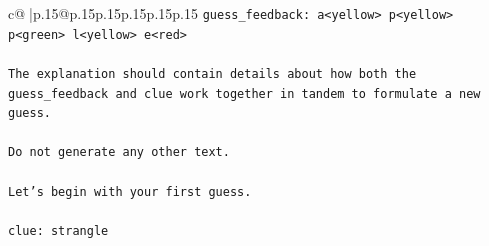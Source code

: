 \documentclass{article}
\begin{document}
{\begin{supertabular}{c@{$\;$}|p{.15\linewidth}@{}p{.15\linewidth}p{.15\linewidth}p{.15\linewidth}p{.15\linewidth}p{.15\linewidth}}
{{{\texttt{guess\_feedback: a<yellow> p<yellow> p<green> l<yellow> e<red>} \\
\\ 
\texttt{The explanation should contain details about how both the guess\_feedback and clue work together in tandem to formulate a new guess.} \\
\\ 
\texttt{Do not generate any other text.} \\
\\ 
\texttt{Let's begin with your first guess.} \\
\\ 
\texttt{clue: strangle} \\
            }
        }
    }
     \\ \\


\end{supertabular}}
\end{document}
